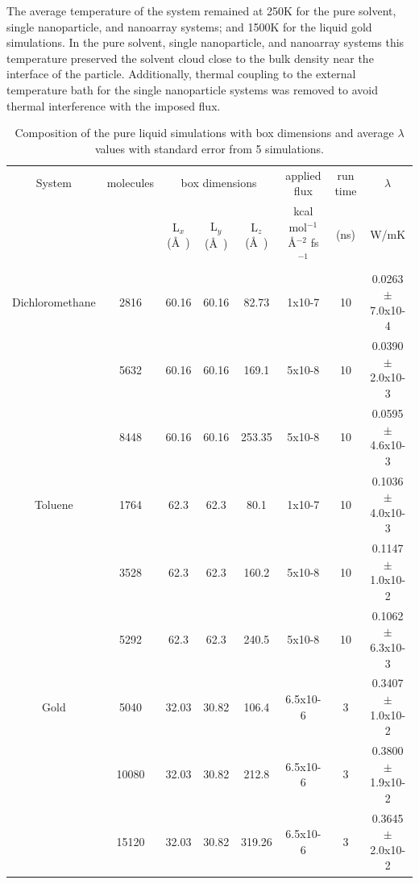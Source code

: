 The average temperature of the system remained at 250K for the pure solvent, single nanoparticle, and nanoarray systems; and 1500K for the liquid gold simulations.
In the pure solvent, single nanoparticle, and nanoarray systems this temperature preserved the solvent cloud close to the bulk density near the interface of the particle.
Additionally, thermal coupling to the external temperature bath for the single nanoparticle systems was removed to avoid thermal interference with the imposed flux.


\begin{landscape}
\begin{table}[]
    \centering
    \caption{Composition of the pure liquid simulations with box dimensions and average $\lambda$ values with standard error from 5 simulations.}
    \begin{tabular}{c|c|ccc|c|c|c}
    \toprule
         System& molecules & \multicolumn{3}{c}{box dimensions}& applied flux& run time&$\lambda$ \\
	& &L$_x$ (\AA\ )&L$_y$ (\AA\ )&L$_z$ (\AA\ ) & kcal mol$^{-1}$ \AA$^{-2}$ fs$^{-1}$ & (ns) & W/mK\\
         \hline
         Dichloromethane&2816&60.16&60.16&82.73&1x10-7&10&0.0263 $\pm$ 7.0x10-4\\
         &5632&60.16&60.16&169.1&5x10-8&10&0.0390 $\pm$ 2.0x10-3\\
         &8448&60.16&60.16&253.35&5x10-8&10&0.0595 $\pm$ 4.6x10-3\\
         Toluene& 1764&62.3&62.3&80.1&1x10-7&10&0.1036 $\pm$ 4.0x10-3\\
          &3528&62.3&62.3&160.2&5x10-8&10&0.1147 $\pm$ 1.0x10-2\\
          &5292&62.3&62.3&240.5&5x10-8&10&0.1062 $\pm$ 6.3x10-3\\
         Gold& 5040&32.03&30.82&106.4&6.5x10-6&3&0.3407 $\pm$1.0x10-2\\
          & 10080&32.03&30.82&212.8&6.5x10-6&3&0.3800 $\pm$ 1.9x10-2\\
           & 15120&32.03&30.82&319.26&6.5x10-6&3&0.3645 $\pm$ 2.0x10-2\\
         \bottomrule
    \end{tabular}
    \label{tab:bulk-comp}
\end{table}
\end{landscape}


